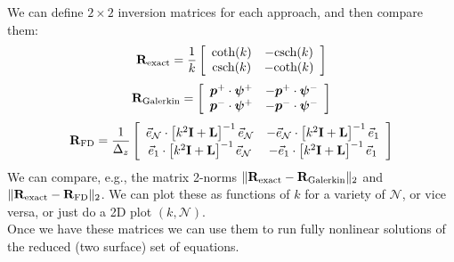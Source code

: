 \documentclass[10pt]{article}
\newcommand{\sN}{\mathcal{N}}
\newcommand{\mat}[1]{\text{\bf #1}}
\begin{document}
We can define $2\times2$ inversion matrices for each approach, and then compare them:
\[\mat{R}_{\text{exact}} = \frac{1}{k}\left[\begin{array}{cc}
\text{coth}(k)&-\text{csch}(k)\\
\text{csch}(k)&-\text{coth}(k)
\end{array}\right]\]
\[\mat{R}_{\text{Galerkin}} =\left[\begin{array}{cc}
\bm{p}^+\cdot\bm{\psi}^+&-\bm{p}^+\cdot\bm{\psi}^-\\
\bm{p}^-\cdot\bm{\psi}^+&-\bm{p}^-\cdot\bm{\psi}^-
\end{array}\right]\]
\[\mat{R}_{\text{FD}} = \frac{1}{\Delta_z}\left[\begin{array}{cc}
\vec{e}_\sN\cdot\left[k^2\mat{I}+\mat{L}\right]^{-1}\vec{e}_{\sN}&-\vec{e}_\sN\cdot\left[k^2\mat{I}+\mat{L}\right]^{-1}\vec{e}_{1}\\
\vec{e}_1\cdot\left[k^2\mat{I}+\mat{L}\right]^{-1}\vec{e}_{\sN}&-\vec{e}_1\cdot\left[k^2\mat{I}+\mat{L}\right]^{-1}\vec{e}_{1}
\end{array}\right]\]
We can compare, e.g., the matrix 2-norms $\|\mat{R}_\text{exact}-\mat{R}_\text{Galerkin}\|_2$ and $\|\mat{R}_\text{exact}-\mat{R}_\text{FD}\|_2$.
We can plot these as functions of $k$ for a variety of $\sN$, or vice versa, or just do a 2D plot $(k,\sN)$.\\

Once we have these matrices we can use them to run fully nonlinear solutions of the reduced (two surface) set of equations.
\end{document}
